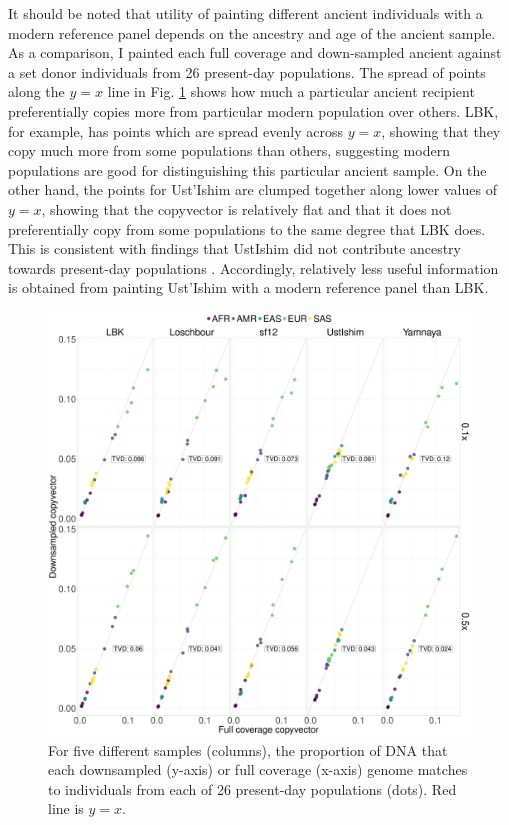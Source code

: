 It should be noted that utility of painting different ancient individuals with a modern reference panel depends on the ancestry and age of the ancient sample. As a comparison, I painted each full coverage and down-sampled ancient against a set donor individuals from 26 present-day populations. The spread of points along the $y=x$ line in Fig. \ref{fig:CP_correlation_allSamples_0.1x_0.5x_30x_moderns} shows how much a particular ancient recipient preferentially copies more from particular modern population over others. LBK, for example, has points which are spread evenly across $y=x$, showing that they copy much more from some populations than others, suggesting modern populations are good for distinguishing this particular ancient sample. On the other hand, the points for Ust'Ishim are clumped together along lower values of $y=x$, showing that the copyvector is relatively flat and that it does not preferentially copy from some populations to the same degree that LBK does. This is consistent with findings that UstIshim did not contribute ancestry towards present-day populations \cite{Fu2014}. Accordingly, relatively less useful information is obtained from painting Ust'Ishim with a modern reference panel than LBK.

\begin{figure}[htp]
    \centering
    \includegraphics[width=1.0\textwidth]{../images/chapter1/CP_correlation_allSamples_0.1x_0.5x_30x_moderns.pdf}
    \caption{For five different samples (columns), the proportion of DNA that each downsampled (y-axis) or full coverage (x-axis) genome matches to individuals from each of 26 present-day populations (dots). Red line is $y=x$.}
    \label{fig:CP_correlation_allSamples_0.1x_0.5x_30x_moderns}
\end{figure}


